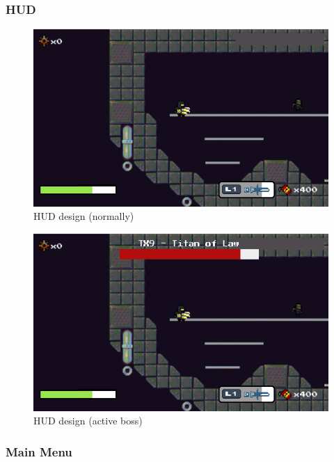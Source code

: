\documentclass[../Main.tex]{subfiles}
\begin{document}
\subsubsection{HUD}

\begin{figure}[H]
	\centering
	\includegraphics[width=\columnwidth]{Figures/HUD.png}
	\caption{HUD design (normally)}
\end{figure}


\begin{figure}[H]
	\centering
	\includegraphics[width=\columnwidth]{Figures/HUDBoss.png}
	\caption{HUD design (active boss)}
\end{figure}

\subsubsection{Main Menu}
\end{document}
